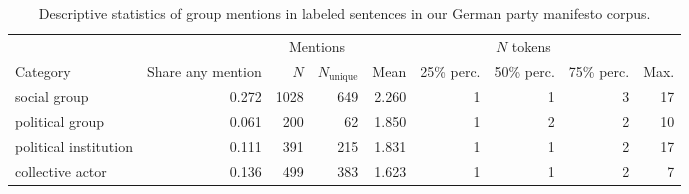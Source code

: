 \begin{table}[!t]

\caption{\label{tab:mention_descriptives_de_mans}Descriptive statistics of group mentions in labeled sentences in our German party manifesto corpus.}
\centering
\fontsize{10}{12}\selectfont
\begin{tabular}[t]{lrrrrrrrr}
\toprule
\multicolumn{2}{c}{ } & \multicolumn{2}{c}{Mentions} & \multicolumn{5}{c}{$N$ tokens} \\
\cmidrule(l{3pt}r{3pt}){3-4} \cmidrule(l{3pt}r{3pt}){5-9}
Category & Share any mention & $N$ & $N_{\text{unique}}$ & Mean & 25\% perc. & 50\% perc. & 75\% perc. & Max.\\
\midrule
social group & 0.272 & 1028 & 649 & 2.260 & 1 & 1 & 3 & 17\\
political group & 0.061 & 200 & 62 & 1.850 & 1 & 2 & 2 & 10\\
political institution & 0.111 & 391 & 215 & 1.831 & 1 & 1 & 2 & 17\\
collective actor & 0.136 & 499 & 383 & 1.623 & 1 & 1 & 2 & 7\\
\bottomrule
\end{tabular}
\end{table}
